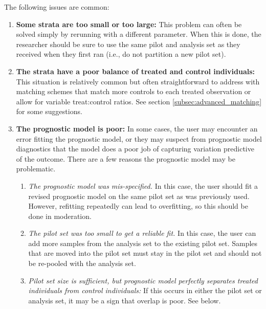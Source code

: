 The following issues are common:
\begin{enumerate}
    \item \textbf{Some strata are too small or too large:} This problem can often be solved simply by rerunning  with a different  parameter.  When this is done, the researcher should be sure to use the same pilot and analysis set as they received when they first ran  (i.e., do not partition a new pilot set).
    \item \textbf{The strata have a poor balance of treated and control individuals:} This situation is relatively common but often straightforward to address with matching schemes that match more controls to each treated observation or  allow for variable treat:control ratios. See section \ref{subsec:advanced_matching} for some suggestions.
    \item \textbf{The prognostic model is poor:}
    In some cases, the user may encounter an error fitting the prognostic model, or they may suspect from prognostic model diagnostics that the model does a poor job of capturing variation predictive of the outcome.  There are a few reasons the prognostic model may be problematic.
    \begin{enumerate}
        \item \textit{The prognostic model was mis-specified.} In this case, the user should fit a revised prognostic model on the same pilot set as was previously used. However, refitting repeatedly can lead to overfitting, so this should be done in moderation.
        \item \textit{The pilot set was too small to get a reliable fit.} In this case, the user can add more samples from the analysis set to the existing pilot set.  Samples that are moved into the pilot set must stay in the pilot set and should not be re-pooled with the analysis set.
        \item \textit{Pilot set size is sufficient, but prognostic model perfectly separates treated individuals from control individuals:} If this occurs in either the pilot set or analysis set, it may be a sign that overlap is poor.  See below.
    \end{enumerate}

\end{enumerate}
